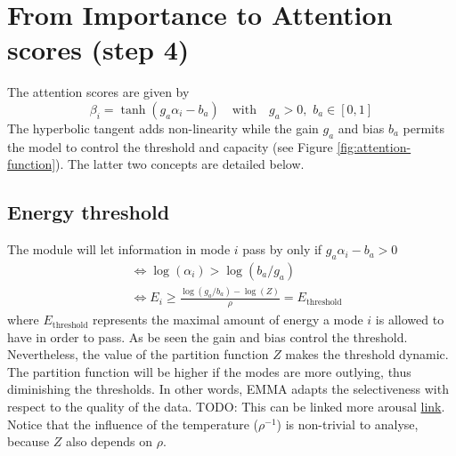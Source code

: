 
\section{From Importance to Attention scores (step 4)}\label{sec:capacity}
The attention scores are given by
\begin{equation}
\beta_i = \tanh(g_a\alpha_i - b_a) \quad \text{with} \quad g_a > 0,\,\,b_a\in [0,1]
\end{equation}
The hyperbolic tangent adds non-linearity while the gain $g_a$ and bias $b_a$ permits the model to control the threshold and capacity (see Figure \ref{fig:attention-function}). The latter two concepts are detailed below.

\subsection*{Energy threshold}
The module will let information in mode $i$ pass by only if $g_a\alpha_i - b_a > 0$
\begin{equation}
\begin{split}
&\Leftrightarrow\log(\alpha_i) > \log(b_a/g_a)\\
&\Leftrightarrow E_i \geq \frac{\log(g_a/b_a) - \log(Z)}{\rho} = E_{\text{threshold}}
\end{split}
\end{equation}
where $E_{\text{threshold}}$ represents the maximal amount of energy a mode $i$ is allowed to have in order to pass. As be seen the gain and bias control the threshold. Nevertheless, the value of the partition function $Z$ makes the threshold dynamic. The partition function will be higher if the modes are more outlying, thus diminishing the thresholds. In other words, EMMA adapts the selectiveness with respect to the quality of the data. TODO: This can be linked more arousal \href{http://www.scholarpedia.org/article/Crossmodal_attention}{link}. Notice that the influence of the temperature ($\rho^{-1}$) is non-trivial to analyse, because $Z$ also depends on $\rho$.

